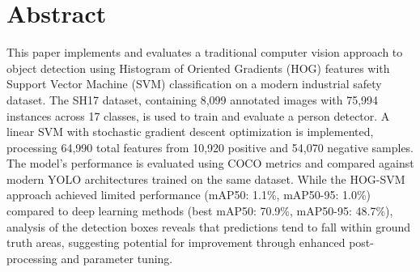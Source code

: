 \section{Abstract}

This paper implements and evaluates a traditional computer vision approach to object detection using Histogram of Oriented Gradients (HOG) features with Support Vector Machine (SVM) classification on a modern industrial safety dataset. 
The SH17 dataset, containing 8,099 annotated images with 75,994 instances across 17 classes, is used to train and evaluate a person detector.
A linear SVM with stochastic gradient descent optimization is implemented, processing 64,990 total features from 10,920 positive and 54,070 negative samples. 
The model's performance is evaluated using COCO metrics and compared against modern YOLO architectures trained on the same dataset. 
While the HOG-SVM approach achieved limited performance (mAP50: 1.1\%, mAP50-95: 1.0\%) compared to deep learning methods (best mAP50: 70.9\%, mAP50-95: 48.7\%), analysis of the detection boxes reveals that predictions tend to fall within ground truth areas, suggesting potential for improvement through enhanced post-processing and parameter tuning. 